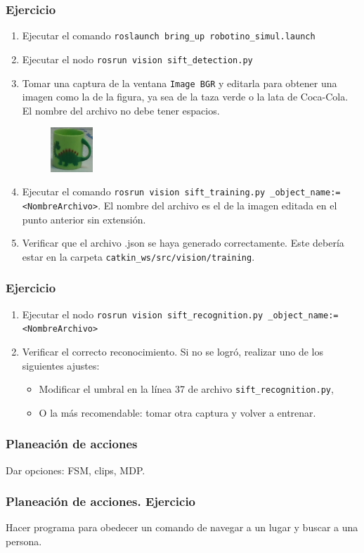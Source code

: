 \documentclass[10pt,spanish,aspectratio=1610]{beamer}
\begin{document}
\begin{frame}\frametitle{Ejercicio}
  \begin{enumerate}
  \item Ejecutar el comando \texttt{roslaunch bring\_up robotino\_simul.launch}
  \item Ejecutar el nodo \texttt{rosrun vision sift\_detection.py}
  \item Tomar una captura de la ventana \texttt{Image BGR} y editarla para obtener una imagen como la de la figura, ya sea de la taza verde o la lata de Coca-Cola. El nombre del archivo no debe tener espacios.
    \begin{figure}
      \centering
      \includegraphics[width=0.15\textwidth]{Figures/GreenCup.png}
    \end{figure}
  \item Ejecutar el comando \texttt{rosrun vision sift\_training.py \_object\_name:=<NombreArchivo>}. El nombre del archivo es el de la imagen editada en el punto anterior sin extensión.
    \item Verificar que el archivo .json se haya generado correctamente. Este debería estar en la carpeta \texttt{catkin\_ws/src/vision/training}.
  \end{enumerate}
\end{frame}

\begin{frame}\frametitle{Ejercicio}
  \begin{enumerate}
  \item Ejecutar el nodo \texttt{rosrun vision sift\_recognition.py \_object\_name:=<NombreArchivo>}
  \item Verificar el correcto reconocimiento. Si no se logró, realizar uno de los siguientes ajustes:
    \begin{itemize}
    \item Modificar el umbral en la línea 37 de archivo \texttt{sift\_recognition.py},
      \item O la más recomendable: tomar otra captura y volver a entrenar. 
    \end{itemize}
  \end{enumerate}
\end{frame}

\begin{frame}\frametitle{Planeación de acciones}
Dar opciones: FSM, clips, MDP.  
\end{frame}

\begin{frame}\frametitle{Planeación de acciones. Ejercicio}
Hacer programa para obedecer un comando de navegar a un lugar y buscar a una persona.
\end{frame}
\end{document}
